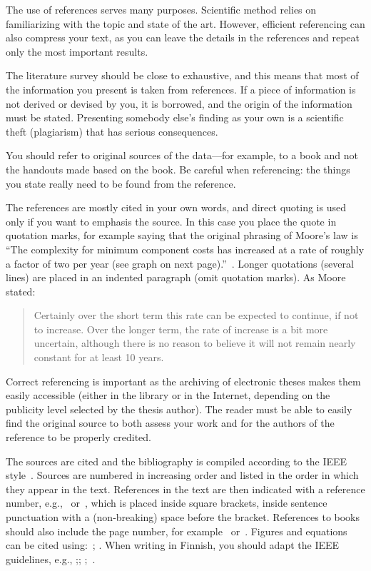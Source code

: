 The use of references serves many purposes. Scientific method relies on familiarizing with the topic and state of the art. However, efficient referencing can also compress your text, as you can leave the details in the references and repeat only the most important results.

The literature survey should be close to exhaustive, and this means that most of the information you present is taken from references. If a piece of information is not derived or devised by you, it is borrowed, and the origin of the information must be stated. Presenting somebody else’s finding as your own is a scientific theft (plagiarism) that has serious consequences.

You should refer to original sources of the data---for example, to a book and not the handouts made based on the book. Be careful when referencing: the things you state really need to be found from the reference.

The references are mostly cited in your own words, and direct quoting is used only if you want to emphasis the source. In this case you place the quote in quotation marks, for example saying that the original phrasing of Moore’s law is  ``The complexity for minimum component costs has increased at a rate of roughly a factor of two per year (see graph on next page).''~\cite{moore}. Longer
quotations (several lines) are placed in an indented paragraph (omit quotation marks). As Moore stated:
\begin{quote}
Certainly over the short term this rate can be expected to continue, if not to increase. Over the longer term, the rate of increase is a bit more uncertain, although there is no reason to believe it will not remain nearly constant for at least 10 years.~\cite{moore}
\end{quote}
Correct referencing is important as the archiving of electronic theses makes them easily accessible (either in the library or in the Internet, depending on the publicity level selected by the thesis author). The reader must be able
to easily find the original source to both assess your work and for the
authors of the reference to be properly credited.

The sources are cited and the bibliography is compiled according to
the IEEE style~\cite{ieeetransactions}.  Sources are numbered in
increasing order and listed in the order in which they appear in the
text.  References in the text are then indicated with a reference
number, e.g.,~\cite{lappalainen} or~\cite{lappalainen, acta, korpela},
which is placed inside square brackets, inside sentence punctuation
with a (non-breaking) space before the bracket. References to books
should also include the page number, for
example~\cite[p.~15]{lappalainen} or~\cite[pp.~15--17]{lappalainen}.
Figures and equations can be cited using:~\cite[Fig.~3]{lappalainen};
\cite[eq.~(3)]{lappalainen}. When writing in Finnish, you should adapt the IEEE guidelines, e.g., \cite[s.~15]{lappalainen};\cite[s.~15--17]{lappalainen};
\cite[Kuva~3]{lappalainen};~\cite[Yhtälö~(3)]{lappalainen}.

